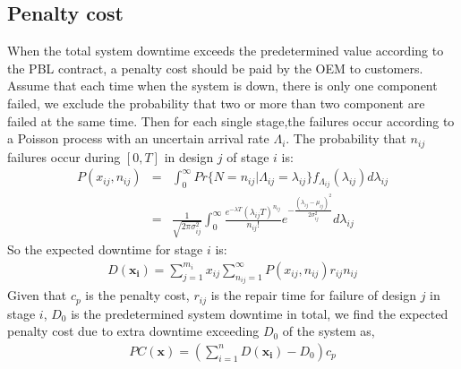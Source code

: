 \documentclass[preprint,12pt]{elsarticle}
\begin{document}
\subsection{Penalty cost}
When the total system downtime exceeds the predetermined value according to the PBL contract, a penalty cost should be paid by the OEM to customers. Assume that each time when the system is down, there is only one component failed, we exclude the probability that two or more than two component are failed at the same time. Then for each single stage,the failures occur according to a Poisson process with an uncertain arrival rate $\Lambda_i$. The probability that $n_{ij}$ failures occur during $[0, T]$ in design $j$ of stage $i$ is:
\begin {eqnarray}
P(x_{ij},n_{ij})&=&\int^{\infty}_{0}{Pr\{N=n_{ij}|\Lambda_{ij}=\lambda_{ij}\}f_{\Lambda_{ij}}(\lambda_{ij})d\lambda_{ij}} \nonumber\\
&=&\frac{1}{\sqrt{2\pi \sigma_{ij}^{2}}}\int^{\infty}_{0}{\frac{e^{-\lambda T}(\lambda_{ij} T)^{n_{ij}}}{n_{ij}!}e^{-\frac{(\lambda_{ij} -\mu_{ij})^{2}}{2\sigma_{ij}^{2}}}d\lambda_{ij}}
\end {eqnarray}
So the expected downtime for stage $i$ is:
\begin{eqnarray}
D(\boldsymbol{x_{i}})=\sum_{j=1}^{m_{i}}{x_{ij}\sum_{n_{ij}=1}^{\infty}{P(x_{ij},n_{ij})r_{ij}n_{ij}}}
\end{eqnarray}
Given that $c_p$ is the penalty cost, $r_{ij}$ is the repair time for failure of design $j$ in stage $i$, $D_0$ is the predetermined system downtime in total, we find the expected penalty cost due to extra downtime exceeding $D_0$ of the system as,
\begin{eqnarray}
PC(\boldsymbol{x})=(\sum_{i=1}^{n}{D(\boldsymbol{x_{i}})-D_{0}})c_{p}
\end{eqnarray}

%
%
\end{document}
